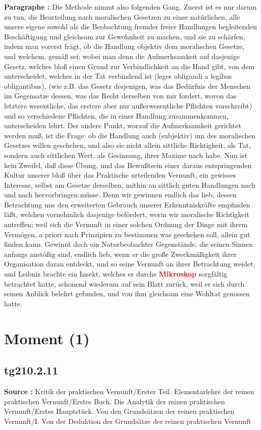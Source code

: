 \documentclass[a4paper,12pt,twoside]{book}
\newcommand{\match}[1]{\textcolor{red}{\textbf{#1}}}
\newcommand{\unnumberedsection}[1]{
	\section*{#1}
	\addcontentsline{toc}{section}{#1}
	\markright{#1}
}
\begin{document}
	\noindent\textbf{Paragraphe : }Die Methode nimmt also folgenden Gang. Zuerst ist es nur darum zu tun, die Beurteilung nach moralischen Gesetzen zu einer natürlichen, alle unsere eigene sowohl als die Beobachtung fremder freier Handlungen begleitenden Beschäftigung und gleichsam zur Gewohnheit zu machen, und sie zu schärfen, indem man vorerst frägt, ob die Handlung objektiv dem moralischen Gesetze, und welchem, gemäß sei; wobei man denn die Aufmerksamkeit auf dasjenige Gesetz, welches bloß einen Grund zur Verbindlichkeit an die Hand gibt, von dem unterscheidet, welches in der Tat verbindend ist (leges obligandi a legibus obligantibus), (wie z.B. das Gesetz desjenigen, was das Bedürfnis der Menschen im Gegensatze dessen, was das Recht derselben von mir fordert, wovon das letztere wesentliche, das erstere aber nur außerwesentliche Pflichten vorschreibt) und so verschiedene Pflichten, die in einer Handlung zusammenkommen, unterscheiden lehrt. Der andere Punkt, worauf die Aufmerksamkeit gerichtet werden muß, ist die Frage: ob die Handlung auch (subjektiv) um des moralischen Gesetzes willen geschehen, und also sie nicht allein sittliche Richtigkeit, als Tat, sondern auch sittlichen Wert, als Gesinnung, ihrer Maxime nach habe. Nun ist kein Zweifel, daß diese Übung, und das Bewußtsein einer daraus entspringenden Kultur unserer bloß über das Praktische urteilenden Vernunft, ein gewisses Interesse, selbst am Gesetze derselben, mithin an sittlich guten Handlungen nach und nach hervorbringen müsse. Denn wir gewinnen endlich das lieb, dessen Betrachtung uns den erweiterten Gebrauch unserer Erkenntniskräfte empfinden läßt, welchen vornehmlich dasjenige befördert, worin wir moralische Richtigkeit antreffen; weil sich die Vernunft in einer solchen Ordnung der Dinge mit ihrem Vermögen, a priori nach Prinzipien zu bestimmen was geschehen soll, allein gut finden kann. Gewinnt doch ein Naturbeobachter Gegenstände, die seinen Sinnen anfangs anstößig sind, endlich lieb, wenn er die große Zweckmäßigkeit ihrer Organisation daran entdeckt,  und so seine Vernunft an ihrer Betrachtung weidet, und Leibniz brachte ein Insekt, welches er durchs \match{Mikroskop} sorgfältig betrachtet hatte, schonend wiederum auf sein Blatt zurück, weil er sich durch seinen Anblick belehrt gefunden, und von ihm gleichsam eine Wohltat genossen hatte. 
	
	\unnumberedsection{Moment (1)} 
	\subsection*{tg210.2.11} 
	\textbf{Source : }Kritik der praktischen Vernunft/Erster Teil. Elementarlehre der reinen praktischen Vernunft/Erstes Buch. Die Analytik der reinen praktischen Vernunft/Erstes Hauptstück. Von den Grundsätzen der reinen praktischen Vernunft/I. Von der Deduktion der Grundsätze der reinen praktischen Vernunft\\  
	
\end{document}
